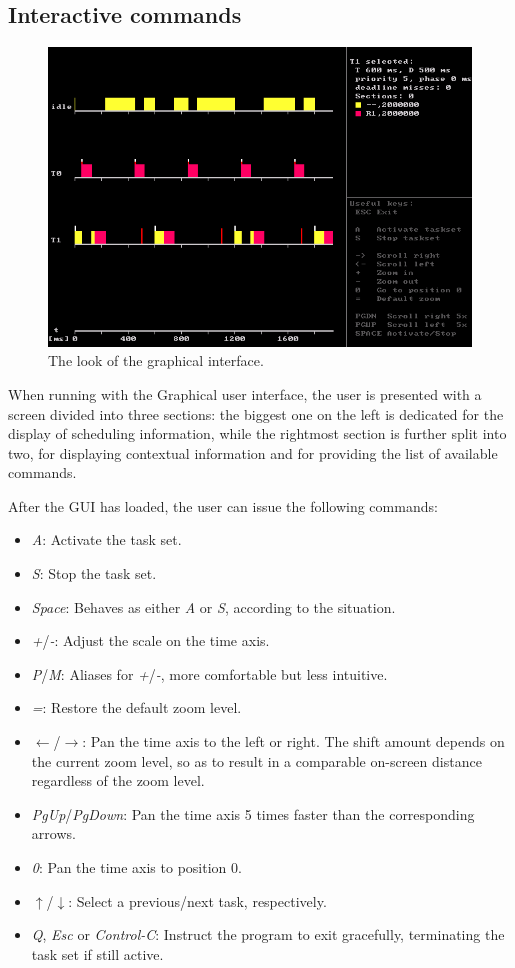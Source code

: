 \documentclass[paper=a4, fontsize=11pt]{scrartcl}
\numberwithin{equation}{section}        %
\numberwithin{figure}{section}          %
\numberwithin{table}{section}               %
\numberwithin{fragment}{section}
\begin{document}
\subsection{Interactive commands}

\begin{figure}
  \centering
  \includegraphics[width=.85\textwidth]{img/gui.png}
  \caption{\label{fig:gui} The look of the graphical interface.}
\end{figure}

When running with the Graphical user interface, the user is presented with a screen divided into three sections: the biggest one on the left is dedicated for the display of scheduling information, while the rightmost section is further split into two, for displaying contextual information and for providing the list of available commands.

After the GUI has loaded, the user can issue the following commands:
\begin{itemize}
\item \textit{A}: Activate the task set.
\item \textit{S}: Stop the task set.
\item \textit{Space}: Behaves as either \textit{A} or \textit{S}, according to the situation.
\item \textit{+}/\textit{-}: Adjust the scale on the time axis.
\item \textit{P}/\textit{M}: Aliases for \textit{+}/\textit{-}, more comfortable but less intuitive.
\item \textit{=}: Restore the default zoom level.
\item $\leftarrow$/$\rightarrow$: Pan the time axis to the left or right. The shift amount depends on the current zoom level, so as to result in a comparable on-screen distance regardless of the zoom level.
\item \textit{PgUp}/\textit{PgDown}: Pan the time axis 5 times faster than the corresponding arrows.
\item \textit{0}: Pan the time axis to position 0.
\item $\uparrow$/$\downarrow$: Select a previous/next task, respectively.
\item \textit{Q}, \textit{Esc} or \textit{Control-C}: Instruct the program to exit gracefully, terminating the task set if still active.
\end{itemize}
\end{document}
